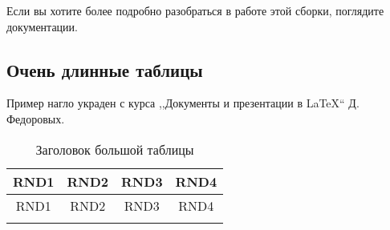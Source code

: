 Если вы хотите более подробно разобраться в работе этой сборки, поглядите документации.

\subsection{Очень длинные таблицы} \label{subsec:long}
Пример нагло украден с курса ,,Документы и презентации в \LaTeX`` Д. Федоровых.

\begin{longtable}{|c|c|c|c|}
	\caption{Заголовок большой таблицы}
	\label{tab:longtable}\\
	\hline
	\textbf{RND1} & \textbf{RND2} & \textbf{RND3} & \textbf{RND4} \\ \hline
	\endfirsthead

	\captioncont
	\hline
	RND1 & RND2 & RND3 & RND4 \\ \hline
	\endhead

	\hline
	\endfoot

	\hline
	\endlastfoot


\end{longtable}
